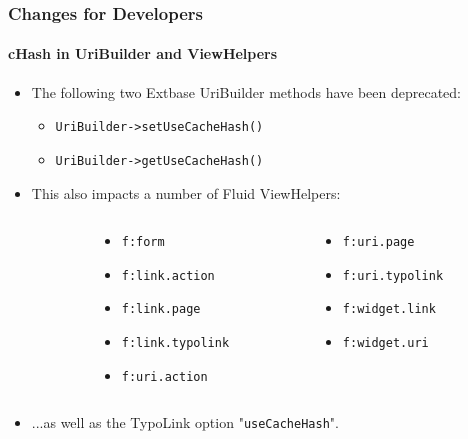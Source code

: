 \begin{frame}[fragile]
	\frametitle{Changes for Developers}
	\framesubtitle{cHash in UriBuilder and ViewHelpers}

	\lstset{basicstyle=\smaller\ttfamily}

	\begin{itemize}
		\item The following two Extbase UriBuilder methods have been deprecated:

			\begin{itemize}
				\item \texttt{UriBuilder->setUseCacheHash()}
				\item \texttt{UriBuilder->getUseCacheHash()}
			\end{itemize}

		\item This also impacts a number of Fluid ViewHelpers:
	\end{itemize}
	\vspace{-0.4cm}
	\begin{columns}[T]
		\begin{column}{.05\textwidth}
		\end{column}
		\begin{column}{.45\textwidth}
			\begin{itemize}\smaller
				\item \texttt{f:form}
				\item \texttt{f:link.action}
				\item \texttt{f:link.page}
				\item \texttt{f:link.typolink}
				\item \texttt{f:uri.action}
			\end{itemize}\normalsize
		\end{column}
		\begin{column}{.45\textwidth}
			\begin{itemize}\smaller
				\item \texttt{f:uri.page}
				\item \texttt{f:uri.typolink}
				\item \texttt{f:widget.link}
				\item \texttt{f:widget.uri}
			\end{itemize}\normalsize
		\end{column}
	\end{columns}
	\vspace{0.2cm}
	\begin{itemize}
		\item ...as well as the TypoLink option "\texttt{useCacheHash}".
	\end{itemize}

\end{frame}

